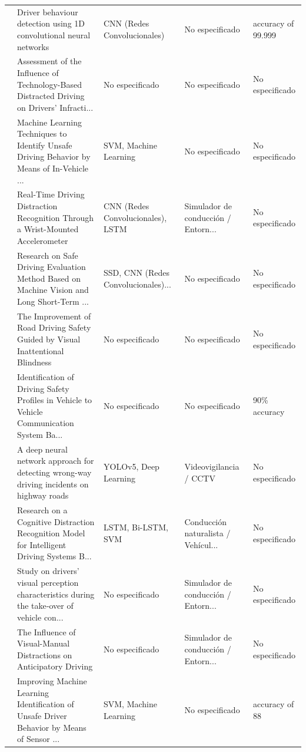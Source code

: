 \begin{table}[htbp]
\begin{tabular}{cp{7.5cm}p{2.8cm}p{2.8cm}p{2.8cm}}
\cite{shahverdy2021behaviour} & Driver behaviour detection using 1D convolutional neural networks & CNN (Redes Convolucionales) & No especificado & accuracy of 99.999 \\
\cite{garcaherrero2021assessment} & Assessment of the Influence of Technology-Based Distracted Driving on Drivers’ Infracti... & No especificado & No especificado & No especificado \\
\cite{lattanzi2021machine} & Machine Learning Techniques to Identify Unsafe Driving Behavior by Means of In-Vehicle ... & SVM, Machine Learning & No especificado & No especificado \\
\cite{xie2021realtime} & Real-Time Driving Distraction Recognition Through a Wrist-Mounted Accelerometer & CNN (Redes Convolucionales), LSTM & Simulador de conducción / Entorn... & No especificado \\
\cite{shi2021research} & Research on Safe Driving Evaluation Method Based on Machine Vision and Long Short-Term ... & SSD, CNN (Redes Convolucionales)... & No especificado & No especificado \\
\cite{xu2021improvement} & The Improvement of Road Driving Safety Guided by Visual Inattentional Blindness & No especificado & No especificado & No especificado \\
\cite{ameen2021identification} & Identification of Driving Safety Profiles in Vehicle to Vehicle Communication System Ba... & No especificado & No especificado & 90\% accuracy \\
\cite{kezebou2021deep} & A deep neural network approach for detecting wrong-way driving incidents on highway roads & YOLOv5, Deep Learning & Videovigilancia / CCTV & No especificado \\
\cite{sun2020research} & Research on a Cognitive Distraction Recognition Model for Intelligent Driving Systems B... & LSTM, Bi-LSTM, SVM & Conducción naturalista / Vehícul... & No especificado \\
\cite{niu2020study} & Study on drivers' visual perception characteristics during the take‐over of vehicle con... & No especificado & Simulador de conducción / Entorn... & No especificado \\
\cite{he2020influence} & The Influence of Visual-Manual Distractions on Anticipatory Driving & No especificado & Simulador de conducción / Entorn... & No especificado \\
\cite{lattanzi2020improving} & Improving Machine Learning Identification of Unsafe Driver Behavior by Means of Sensor ... & SVM, Machine Learning & No especificado & accuracy of 88 \\

\end{tabular}
\end{table}

